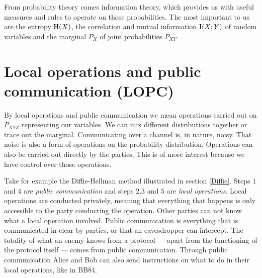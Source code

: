     
    From probability theory comes information theory, which provides us with useful measures and rules to operate on those probabilities.
    The most important to us are the entropy $\operatorname{H} (X)$, the correlation and mutual information $\operatorname{I}(X;Y)$ of random variables and the marginal $P_X$ of joint probabilities $P_{XY}$.
    
    
    
    
\section{Local operations and public communication (LOPC)}
    By local operations and public communication we mean operations carried out on $P_{XYZ}$ representing our variables.
    We can mix different distributions together or trace out the marginal.
    Communicating over a channel is, in nature, noisy. 
    That noise is also a form of operations on the probability distribution.
    Operations can also be carried out directly by the parties.
    This is of more interest because we have control over those operations.
    
    Take for example the Diffie-Hellman method illustrated in section \ref{Diffie}.
    Steps $1$ and $4$ are \emph{public communication} and steps $2$,$3$ and $5$ are \emph{local operations}.
    Local operations are conducted privately, meaning that everything that happens is only accessible to the party conducting the operation.
    Other parties can not know what a local operation involved.
    Public communication is everything that is communicated in clear by parties, or that an eavesdropper can intercept.
    The totality of what an enemy knows from a protocol --- apart from the functioning of the protocol itself --- comes from public communication.
    Through public communication Alice and Bob can also send instructions on what to do in their local operations, like in BB84.
    
